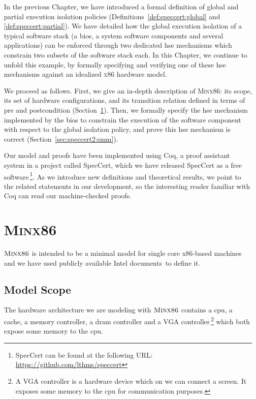 \vspace{1cm}\noindent
%
In the previous Chapter, we have introduced a formal definition of global and
partial execution isolation policies (Definitions~\ref{def:speccert:global} and
\ref{def:speccert:partial}).
%
We have detailed how the global execution isolation of a typical software stack
(a \ac{bios}, a system software components and several applications) can be
enforced through two dedicated \ac{hse} mechanisms which constrain two subsets
of the software stack each.
%
In this Chapter, we continue to unfold this example, by formally specifying and
verifying one of these \ac{hse} mechanisms against an idealized {\scshape x86}
hardware model.

We proceed as follows.
%
First, we give an in-depth description of {\scshape Minx86}: its scope, its set
of hardware configurations, and its transition relation defined in terms of pre
and postcondition (Section~\ref{sec:speccert2:minx86}).
%
Then, we formally specify the \ac{hse} mechanism implemented by the \ac{bios} to
constrain the execution of the software component with respect to the global
isolation policy, and prove this \ac{hse} mechanism is correct
(Section~\ref{sec:speccert2:smm}).

Our model and proofs have been implemented using Coq, a proof assistant system
in a project called SpecCert, which we have released SpecCert as a free
software\,\footnote{SpecCert can be found at the following URL:
  \url{https://github.com/lthms/speccert}}.
%
As we introduce new definitions and theoretical results, we point to the related
statements in our development, so the interesting reader familiar with Coq can
read our machine-checked proofs.

\section{{\scshape Minx86}}
\label{sec:speccert2:minx86}

$\textsc{Minx86}$ is intended to be a minimal model for single core x86-based
machines and we have used publicly available Intel
documents\,\cite{intel2013celeron,intel2009mch,intel2014manual} to define it.

\subsection{Model Scope}

The hardware architecture we are modeling with $\textsc{Minx86}$ contains a
\ac{cpu}, a cache, a memory controller, a \ac{dram} controller and a VGA
controller\,\footnote{A VGA controller is a hardware device which on we can
  connect a screen. It exposes some memory to the \ac{cpu} for communication
  purposes.} which both expose some memory to the \ac{cpu}.

